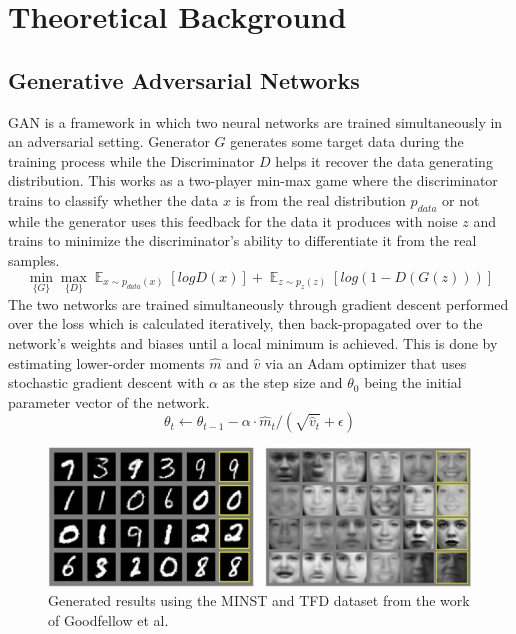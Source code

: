\documentclass{Configuration_Files/PoliMi3i_thesis}
\begin{document}
\section{Theoretical Background}

\subsection{Generative Adversarial Networks}
GAN is a framework in which two neural networks are trained simultaneously in an 
adversarial setting. Generator $G$ generates some target data during the training 
process while the Discriminator $D$ helps it recover the data generating distribution. 
This works as a two-player min-max game \cite{IaG14} where the discriminator trains to 
classify whether the data $x$ is from the real distribution $p_{data}$ or not while the 
generator uses this feedback for the data it produces with noise $z$ and trains to 
minimize the discriminator’s ability to differentiate it from the real samples.
\begin{equation} \label{eq:ganminmax}
\min_{\{G\}}\max_{\{D\}} \mathop{{}\mathbb{E}}_{x\sim p_{data}(x)}[logD(x)]+ \mathop{{}\mathbb{E}}_{z\sim p_{z}(z)}[log(1-D(G(z)))]
\end{equation}
The two networks are trained simultaneously through gradient descent performed
over the loss which is calculated iteratively, then back-propagated over to the
network’s weights and biases until a local minimum is achieved. This is done by 
estimating lower-order moments $\hat{m}$ and $\hat{v}$ via an Adam optimizer that uses 
stochastic gradient descent with $\alpha$ as the step size and $\theta_{0}$ being the initial parameter 
vector of the network.
\begin{equation} \label{eq:ganopt}
\theta_{t}\leftarrow \theta_{t-1} - \alpha \cdot \hat{m}_{t}/(\sqrt{\hat{v}_{t}} + \epsilon)
\end{equation}
\begin{figure}[H]
    \centering
    \includegraphics[width=1\textwidth]{gan_results.jpg}
    \caption[Generated numbers and faces from the work of Goodfellow et al.]{Generated results using the MINST and TFD dataset from the work of Goodfellow et al.}
    \label{fig:ganresults}
\end{figure}
\end{document}

